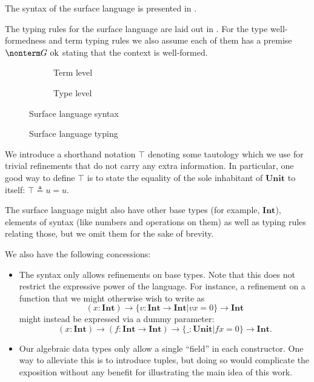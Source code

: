 \documentclass[a4paper]{article}
\newcommand{\unit}{u}
\newcommand{\Unit}{\textbf{Unit}}
\newcommand{\Int}{\textbf{Int}}
\begin{document}
The syntax of the surface language is presented in .

The typing rules for the surface language are laid out in .
For the type well-formedness and term typing rules
we also assume each of them has a premise $\nonterm G \text{ ok}$
stating that the context is well-formed.

\begin{figure}[ht]
  \footnotesize
  \begin{subfigure}{.6\textwidth}
    \caption{Term level}
  \end{subfigure}
  \begin{subfigure}{.5\textwidth}
    \caption{Type level}
  \end{subfigure}
  \caption{Surface language syntax}
  \label{fig:surface_syntax}
\end{figure}

\begin{figure}[ht]
  \footnotesize
  \caption{Surface language typing}
  \label{fig:surface_typing}
\end{figure}


We introduce a shorthand notation $\top$ denoting some tautology
which we use for trivial refinements that do not carry any extra information.
In particular, one good way to define $\top$ is
to state the equality of the sole inhabitant of $\Unit$ to itself:
$\top \triangleq \unit = \unit$.

The surface language might also have other base types (for example, $\Int$),
elements of syntax (like numbers and operations on them)
as well as typing rules relating those,
but we omit them for the sake of brevity.

We also have the following concessions:
\begin{itemize}
  \item The syntax only allows refinements on base types.
    Note that this does not restrict the expressive power of the language.
    For instance, a refinement on a function that we might otherwise wish to write as
    \[
      (x : \Int) \rightarrow \{ v : \Int \rightarrow \Int | v x = 0 \} \rightarrow \Int
    \]
    might instead be expressed via a dummy parameter:
    \[
      (x : \Int) \rightarrow (f : \Int \rightarrow \Int) \rightarrow \{ \_ : \Unit | f x = 0 \} \rightarrow \Int.
    \]
  \item Our algebraic data types only allow a single ``field'' in each constructor.
    One way to alleviate this is to introduce tuples,
    but doing so would complicate the exposition
    without any benefit for illustrating the main idea of this work.
\end{itemize}
\end{document}
